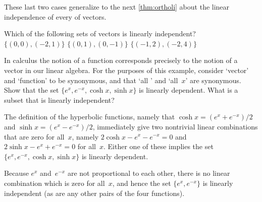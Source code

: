 \begin{example}
\begin{enumerate}[ref=\ref{eg:lindep}(\alph*)]
\end{enumerate}
These last two cases generalize to the next \cref{thm:ortholi} about the linear independence of every  of vectors.
\end{example}



\begin{activity}
Which of the following sets of vectors is linearly independent?
{\(\{(0,0),(-2,1)\}\)}
{\(\{(0,1),(0,-1)\}\)}
{\(\{(-1,2),(-2,4)\}\)}
\end{activity}



\begin{reduce}
\begin{example} 
In calculus the notion of a function corresponds precisely to the notion of a vector in our linear algebra.  
For the purposes of this example, consider `vector' and `function' to be synonymous, and that `all ' and `all~\(x\)' are synonymous. 
Show that the set \(\{e^x,e^{-x},\cosh x,\sinh x\}\) is linearly dependent.  
What is a subset that is linearly independent?
\begin{solution} 
The definition of the hyperbolic functions, namely that \(\cosh x=(e^x+e^{-x})/2\) and \(\sinh x=(e^x-e^{-x})/2\), immediately give two nontrivial linear combinations that are zero for all~\(x\), namely \(2\cosh x-e^x-e^{-x}=0\) and \(2\sinh x-e^x+e^{-x}=0\) for all~\(x\).
Either one of these implies the set \(\{e^x,e^{-x},\cosh x,\sinh x\}\) is linearly dependent.

Because \(e^x\) and~\(e^{-x}\) are not proportional to each other, there is no linear combination which is zero for all~\(x\), and hence the set \(\{e^x,e^{-x}\}\) is linearly independent (as are any other pairs of the four functions).
\end{solution}
\end{example}
\end{reduce}






